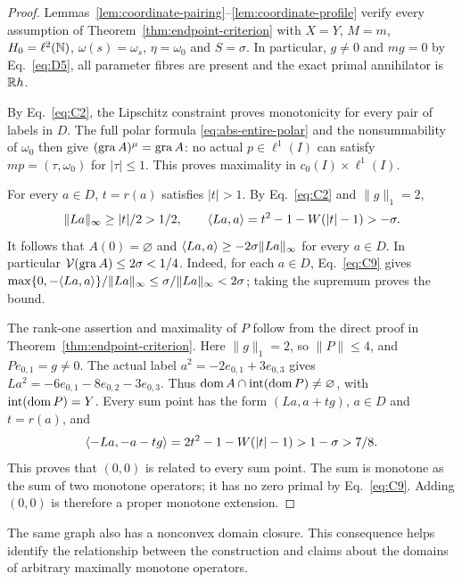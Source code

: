\begin{proof}
Lemmas~\ref{lem:coordinate-pairing}--\ref{lem:coordinate-profile}
verify every assumption of Theorem~\ref{thm:endpoint-criterion}
with $X=Y$, $M=m$, $H_0=\ell^2(\mathbb N)$, $\omega(s)=\omega_s$,
$\eta=\omega_0$ and $S=\sigma$. In particular, $g\ne0$ and $mg=0$
by Eq.~\eqref{eq:D5}, all parameter fibres are present and the
exact primal annihilator is $\mathbb R h$. 

By Eq.~\eqref{eq:C2}, the Lipschitz constraint proves monotonicity
for every pair of labels in $D$. The full polar formula
\eqref{eq:abs-entire-polar} and the nonsummability of $\omega_0$
then give $(\operatorname{gra} A)^\mu=\operatorname{gra} A$: no actual $p\in\ell^1(I)$ can
satisfy $mp=(\tau,\omega_0)$ for $|\tau|\le1$. This proves
maximality in $c_0(I)\times\ell^1(I)$.

\label{sec:C5}
For every $a\in D$, $t=r(a)$ satisfies $|t|>1$. By Eq.~\eqref{eq:C2}
and $\|g\|_1=2$,
\begin{equation}
\|La\|_\infty\ge|t|/2>1/2,\qquad
\langle La,a\rangle=t^2-1-W(|t|-1)>-\sigma.
\label{eq:C9}
\end{equation}
It follows that $A(0)=\varnothing$ and
$\langle La,a\rangle\ge-2\sigma\|La\|_\infty$ for every $a\in D$.
In particular $\mathcal V(\operatorname{gra} A)\le2\sigma<1/4$.
Indeed, for each $a\in D$, Eq.~\eqref{eq:C9} gives
$\max\{0,-\langle La,a\rangle\}/\|La\|_\infty
\le\sigma/\|La\|_\infty<2\sigma$; taking the supremum proves the bound.

\label{sec:C6}
The rank-one assertion and maximality of $P$ follow from the direct
proof in Theorem~\ref{thm:endpoint-criterion}. Here $\|g\|_1=2$,
so $\|P\|\le4$, and $Pe_{0,1}=g\ne0$.
The actual label $a^2=-2e_{0,1}+3e_{0,3}$ gives
$La^2=-6e_{0,1}-8e_{0,2}-3e_{0,3}$. Thus
$\operatorname{dom} A\cap\operatorname{int}(\operatorname{dom} P)\ne\varnothing$, with
$\operatorname{int}(\operatorname{dom} P)=Y$. Every sum point has the form
$(La,a+tg)$, $a\in D$ and $t=r(a)$, and
\begin{equation}
\langle -La,-a-tg\rangle=2t^2-1-W(|t|-1)>1-\sigma>7/8.
\label{eq:C11}
\end{equation}
This proves that $(0,0)$ is related to every sum point. The sum is
monotone as the sum of two monotone operators; it has no zero primal by
Eq.~\eqref{eq:C9}. Adding $(0,0)$ is therefore a proper monotone extension.

\end{proof}

\label{sec:domain-comparison}
The same graph also has a nonconvex domain closure. This consequence
helps identify the relationship between the construction and claims
about the domains of arbitrary maximally monotone operators.

